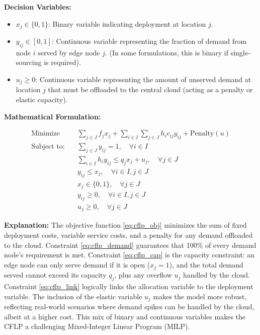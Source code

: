 \documentclass[11pt,a4paper]{article}
\begin{document}
\textbf{Decision Variables:}
\begin{itemize}
    \item $x_j \in \{0, 1\}$: Binary variable indicating deployment at location $j$.
    \item $y_{ij} \in [0, 1]$: Continuous variable representing the fraction of demand from node $i$ served by edge node $j$. (In some formulations, this is binary if single-sourcing is required).
    \item $u_j \geq 0$: Continuous variable representing the amount of unserved demand at location $j$ that must be offloaded to the central cloud (acting as a penalty or elastic capacity).
\end{itemize}

\textbf{Mathematical Formulation:}

\begin{align}
    \text{Minimize} \quad & \sum_{j \in J} f_j x_j + \sum_{i \in I} \sum_{j \in J} h_i c_{ij} y_{ij} + \text{Penalty}(u) \label{eq:cflp_obj} \\
    \text{Subject to:} \quad & \sum_{j \in J} y_{ij} = 1, \quad \forall i \in I \label{eq:cflp_demand} \\
    & \sum_{i \in I} h_i y_{ij} \leq q_j x_j + u_j, \quad \forall j \in J \label{eq:cflp_cap} \\
    & y_{ij} \leq x_j, \quad \forall i \in I, j \in J \label{eq:cflp_link} \\
    & x_j \in \{0, 1\}, \quad \forall j \in J \label{eq:cflp_x} \\
    & y_{ij} \geq 0, \quad \forall i \in I, j \in J \label{eq:cflp_y} \\
    & u_j \geq 0, \quad \forall j \in J \label{eq:cflp_u}
\end{align}

\textbf{Explanation:} The objective function \eqref{eq:cflp_obj} minimizes the sum of fixed deployment costs, variable service costs, and a penalty for any demand offloaded to the cloud. Constraint \eqref{eq:cflp_demand} guarantees that 100\% of every demand node's requirement is met. Constraint \eqref{eq:cflp_cap} is the capacity constraint: an edge node can only serve demand if it is open ($x_j=1$), and the total demand served cannot exceed its capacity $q_j$, plus any overflow $u_j$ handled by the cloud. Constraint \eqref{eq:cflp_link} logically links the allocation variable to the deployment variable. The inclusion of the elastic variable $u_j$ makes the model more robust, reflecting real-world scenarios where demand spikes can be handled by the cloud, albeit at a higher cost. This mix of binary and continuous variables makes the CFLP a challenging Mixed-Integer Linear Program (MILP).
\end{document}
